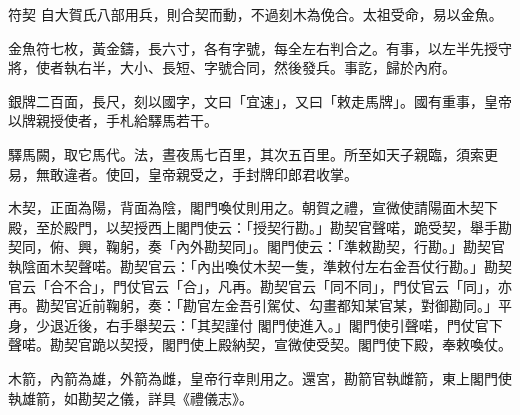 \begin{pinyinscope}
 符契
 自大賀氏八部用兵，則合契而動，不過刻木為俛合。太祖受命，易以金魚。



 金魚符七枚，黃金鑄，長六寸，各有字號，每全左右判合之。有事，以左半先授守將，使者執右半，大小、長短、字號合同，然後發兵。事訖，歸於內府。



 銀牌二百面，長尺，刻以國字，文曰「宜速」，又曰「敕走馬牌」。國有重事，皇帝以牌親授使者，手札給驛馬若干。



 驛馬闕，取它馬代。法，晝夜馬七百里，其次五百里。所至如天子親臨，須索更易，無敢違者。使回，皇帝親受之，手封牌印郎君收掌。



 木契，正面為陽，背面為陰，閣門喚仗則用之。朝賀之禮，宣微使請陽面木契下殿，至於殿門，以契授西上閣門使云：「授契行勘。」勘契官聲喏，跪受契，舉手勘契同，俯、興，鞠躬，奏「內外勘契同」。閣門使云：「準敕勘契，行勘。」勘契官執陰面木契聲喏。勘契官云：「內出喚仗木契一隻，準敕付左右金吾仗行勘。」勘契官云「合不合」，門仗官云「合」，凡再。勘契官云「同不同」，門仗官云「同」，亦再。勘契官近前鞠躬，奏：「勘官左金吾引駕仗、勾畫都知某官某，對御勘同。」平身，少退近後，右手舉契云：「其契謹付
 閣門使進入。」閣門使引聲喏，門仗官下聲喏。勘契官跪以契授，閣門使上殿納契，宣微使受契。閣門使下殿，奉敕喚仗。



 木箭，內箭為雄，外箭為雌，皇帝行幸則用之。還宮，勘箭官執雌箭，東上閣門使執雄箭，如勘契之儀，詳具《禮儀志》。



\end{pinyinscope}